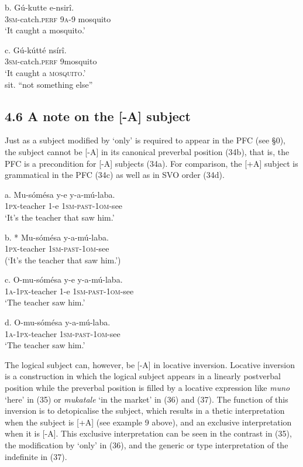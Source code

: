 \documentclass[output=paper]{langsci/langscibook}
\begin{document}
\ea
\gll   b.  Gú-kutte    e-nsirî.\\
         \textsc{3sm}{}-catch.\textsc{perf}  \textsc{9a}{}-9 mosquito\\
\glt     ‘It caught a mosquito.’
\z

\ea
\gll   c.  Gú-kútté    nsírî.\\
         \textsc{3sm}{}-catch.\textsc{perf}  9mosquito\\
\glt ‘It caught a \textsc{mosquito}.’\\
sit. “not something else”
\z

\subsection{4.6 A note on the [-A] subject}

Just as a subject modified by ‘only’ is required to appear in the PFC (see §0), the subject cannot be [-A] in its canonical preverbal position (34b), that is, the PFC is a precondition for [-A] subjects (34a). For comparison, the [+A] subject is grammatical in the PFC (34c) as well as in SVO order (34d).

\ea
\gll   a.  Mu-sómésa  y-e  y-a-mú-laba.\\
         \textsc{1px}{}-teacher  1-e  \textsc{1sm}{}-\textsc{past}{}-\textsc{1om}{}-see\\
\glt     ‘It’s the teacher that saw him.’
\z

\ea
\gll   b.  * Mu-sómésa  y-a-mú-laba.\\
         \textsc{1px}{}-teacher  \textsc{1sm}{}-\textsc{past}{}-\textsc{1om}{}-see\\
\glt     (‘It’s the teacher that saw him.’)
\z

\ea
\gll   c.  O-mu-sómésa  y-e  y-a-mú-laba.\\
         \textsc{1a}{}-\textsc{1px}{}-teacher  1-e  \textsc{1sm}{}-\textsc{past}{}-\textsc{1om}{}-see\\
\glt     ‘The teacher saw him.’
\z

\ea
\gll   d.  O-mu-sómésa  y-a-mú-laba.\\
         \textsc{1a}{}-\textsc{1px}{}-teacher  \textsc{1sm}{}-\textsc{past}{}-\textsc{1om}{}-see\\
\glt     ‘The teacher saw him.’
\z

The logical subject can, however, be [-A] in locative inversion. Locative inversion is a construction in which the logical subject appears in a linearly postverbal position while the preverbal position is filled by a locative expression like \textit{muno} ‘here’ in (35) or \textit{mukatale} ‘in the market’ in (36) and (37). The function of this inversion is to detopicalise the subject, which results in a thetic interpretation when the subject is [+A] (see example 9 above), and an exclusive interpretation when it is [-A]. This exclusive interpretation can be seen in the contrast in (35), the modification by ‘only’ in (36), and the generic or type interpretation of the indefinite in (37).
\end{document}
